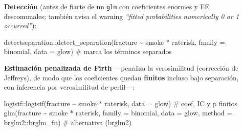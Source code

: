 \documentclass[
  letterpaper,
  DIV=11,
  numbers=noendperiod]{scrartcl}
\newenvironment{Shaded}{\begin{snugshade}}{\end{snugshade}}
\newcommand{\AttributeTok}[1]{\textcolor[rgb]{0.40,0.45,0.13}{#1}}
\newcommand{\CommentTok}[1]{\textcolor[rgb]{0.37,0.37,0.37}{#1}}
\newcommand{\FunctionTok}[1]{\textcolor[rgb]{0.28,0.35,0.67}{#1}}
\newcommand{\NormalTok}[1]{\textcolor[rgb]{0.00,0.23,0.31}{#1}}
\newcommand{\SpecialCharTok}[1]{\textcolor[rgb]{0.37,0.37,0.37}{#1}}
\begin{document}
\begin{tcolorbox}[enhanced jigsaw, coltitle=black, rightrule=.15mm, arc=.35mm, leftrule=.75mm, colback=white, colbacktitle=quarto-callout-tip-color!10!white, left=2mm, breakable, toptitle=1mm, toprule=.15mm, bottomtitle=1mm, titlerule=0mm, title=\textcolor{quarto-callout-tip-color}{\faLightbulb}\hspace{0.5em}{🔧 En R. Detectar la separación y estimar por verosimilitud penalizada
(Firth)}, bottomrule=.15mm, opacityback=0, opacitybacktitle=0.6, colframe=quarto-callout-tip-color-frame]

\textbf{Detección} (antes de fiarte de un \texttt{glm} con coeficientes
enormes y EE descomunales; también avisa el warning \emph{``fitted
probabilities numerically 0 or 1 occurred''}):

\begin{Shaded}
\begin{Highlighting}[]
\NormalTok{detectseparation}\SpecialCharTok{::}\FunctionTok{detect\_separation}\NormalTok{(fracture }\SpecialCharTok{\textasciitilde{}}\NormalTok{ smoke }\SpecialCharTok{*}\NormalTok{ raterisk,}
                                    \AttributeTok{family =}\NormalTok{ binomial, }\AttributeTok{data =}\NormalTok{ glow)   }\CommentTok{\# marca los términos separados}
\end{Highlighting}
\end{Shaded}

\textbf{Estimación penalizada de Firth} ---penaliza la verosimilitud
(corrección de Jeffreys), de modo que los coeficientes quedan
\textbf{finitos} incluso bajo separación, con inferencia por
verosimilitud de perfil---:

\begin{Shaded}
\begin{Highlighting}[]
\NormalTok{logistf}\SpecialCharTok{::}\FunctionTok{logistf}\NormalTok{(fracture }\SpecialCharTok{\textasciitilde{}}\NormalTok{ smoke }\SpecialCharTok{*}\NormalTok{ raterisk, }\AttributeTok{data =}\NormalTok{ glow)            }\CommentTok{\# coef, IC y p finitos}
\FunctionTok{glm}\NormalTok{(fracture }\SpecialCharTok{\textasciitilde{}}\NormalTok{ smoke }\SpecialCharTok{*}\NormalTok{ raterisk, }\AttributeTok{family =}\NormalTok{ binomial, }\AttributeTok{data =}\NormalTok{ glow,}
    \AttributeTok{method =}\NormalTok{ brglm2}\SpecialCharTok{::}\NormalTok{brglm\_fit)                                       }\CommentTok{\# alternativa (brglm2)}
\end{Highlighting}
\end{Shaded}

\end{tcolorbox}
\end{document}
